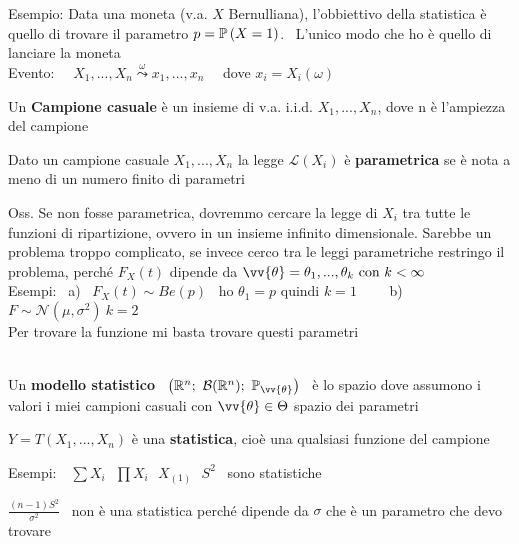 
Esempio: Data una moneta (v.a. $X$ Bernulliana), l'obbiettivo della statistica è quello di trovare il parametro  $p=\mathbb{P} \left( X=1 \right)$. \ L'unico modo che ho è quello di lanciare la moneta\\

Evento: \ \ $X_1, ..., X_n \overset{\omega}{\leadsto} x_1,...,x_n$ \ \ dove $x_i=X_i(\omega)$

\begin{defi}
Un \textbf{Campione casuale} è un insieme di v.a. i.i.d. $X_1, ..., X_n$, dove
n è l'ampiezza del campione
\end{defi}

\begin{defi}
    Dato un campione casuale $X_1, ..., X_n$ la legge $\mathcal{L}(X_i)$ è \textbf{parametrica} se è nota a meno di un numero finito di parametri
\end{defi}


Oss. Se non fosse parametrica, dovremmo cercare la legge di $X_i$ tra tutte le funzioni di ripartizione, ovvero in un insieme infinito dimensionale. Sarebbe un problema troppo complicato, se invece cerco tra le leggi parametriche restringo il problema, perché $F_X(t)$ dipende da $\vv{\theta}=\theta_1,...,\theta_k \text{ con } k<\infty$\\ 

Esempi: \ a) \ $F_X(t)\sim Be(p)$ \ ho $\theta_1=p \text{ quindi } k=1$ \ \  \ \ b) $F\sim\mathcal{N}(\mu,\sigma^2) \ k=2$\\
Per trovare la funzione mi basta trovare questi parametri\\ \\
%
\begin{defi}
    Un \textbf{modello statistico} \ $\left( \R^n;\ \mathcal{B}(\R^n); \ \mathbb{P}_{\vv{\theta}} \right)$ \ è lo spazio dove assumono i valori i miei campioni casuali con $\vv{\theta}\in \Theta$ spazio dei parametri
\end{defi}

\begin{defi}
    $Y=T(X_1,...,X_n)$ è una \textbf{statistica}, cioè una qualsiasi funzione del campione
\end{defi}

Esempi:\ \ $\sum X_i \ \ \ \prod X_i \ \ \ X_{(1)} \ \ \ S^2$ \ sono statistiche
\smallskip

\phantom{Esempi: }$\frac{(n-1)S^2}{\sigma^2}$ \ non è una statistica perché dipende da $\sigma$ che è un parametro che devo trovare\\ \\

